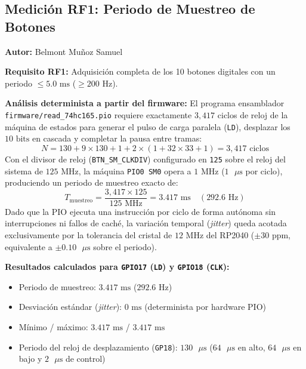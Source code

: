 
\subsection{Medición RF1: Periodo de Muestreo de Botones}
\textbf{Autor:} Belmont Muñoz Samuel

\textbf{Requisito RF1:} Adquisición completa de los 10 botones digitales con un periodo $\le 5.0\text{ ms}$ ($\ge 200\text{ Hz}$).

\textbf{Análisis determinista a partir del firmware:} El programa ensamblador \texttt{firmware/read\_74hc165.pio} requiere exactamente $3{,}417$ ciclos de reloj de la máquina de estados para generar el pulso de carga paralela (\texttt{LD}), desplazar los $10\text{ bits}$ en cascada y completar la pausa entre tramas:
\[
N = 130 + 9 \times 130 + 1 + 2 \times (1 + 32 \times 33 + 1) = 3{,}417\text{ ciclos}
\]
Con el divisor de reloj (\texttt{BTN\_SM\_CLKDIV}) configurado en \texttt{125} sobre el reloj del sistema de $125\text{ MHz}$, la máquina \texttt{PIO0 SM0} opera a $1\text{ MHz}$ ($1\text{ }\mu\text{s}$ por ciclo), produciendo un periodo de muestreo exacto de:
\[
T_{\text{muestreo}} = \frac{3{,}417 \times 125}{125\text{ MHz}} = 3.417\text{ ms} \quad (292.6\text{ Hz})
\]
Dado que la PIO ejecuta una instrucción por ciclo de forma autónoma sin interrupciones ni fallos de caché, la variación temporal (\textit{jitter}) queda acotada exclusivamente por la tolerancia del cristal de $12\text{ MHz}$ del RP2040 ($\pm 30\text{ ppm}$, equivalente a $\pm 0.10\text{ }\mu\text{s}$ sobre el periodo).

\textbf{Resultados calculados para \texttt{GPIO17} (\texttt{LD}) y \texttt{GPIO18} (\texttt{CLK}):}
\begin{itemize}
	\item Periodo de muestreo: $3.417\text{ ms}$ ($292.6\text{ Hz}$)
	\item Desviación estándar (\textit{jitter}): $0\text{ ms}$ (determinista por hardware PIO)
	\item Mínimo / máximo: $3.417\text{ ms}$ / $3.417\text{ ms}$
	\item Periodo del reloj de desplazamiento (\texttt{GP18}): $130\text{ }\mu\text{s}$ ($64\text{ }\mu\text{s}$ en alto, $64\text{ }\mu\text{s}$ en bajo y $2\text{ }\mu\text{s}$ de control)
\end{itemize}

